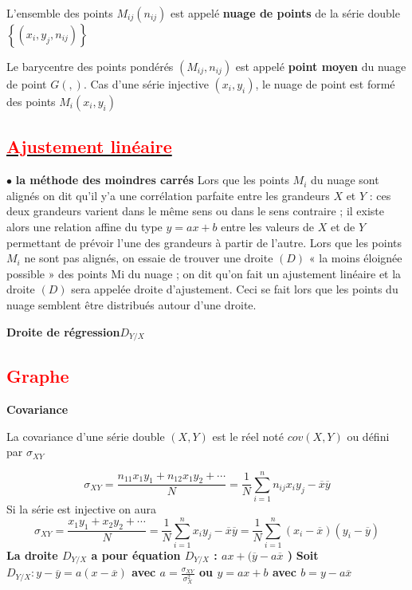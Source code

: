 \documentclass[12pt]{article}
\begin{document}
L’ensemble des points $M_{ij}(n_{ij})$ est appelé \textbf{nuage de points} de la série double   
$\left\lbrace (x_{i} , y_{j}, n_{ij}) \right\rbrace $

Le barycentre des points pondérés $( M_{ij}, n_{ij})$ est appelé \textbf{point moyen} du nuage de point $G( , )$.
Cas d’une série injective ${(x_{i} , y_{i})}$, le nuage de point est formé des points 
$M_{i} (x_{i} , y_{i})$
\subsection*{\underline{\textbf{\textcolor{red}{Ajustement linéaire}}}}
$\bullet$ \textbf{la méthode des moindres carrés} 
Lors que les points $M_{i}$ du nuage sont alignés on dit qu’il y’a une corrélation parfaite entre les grandeurs $X$ et $Y$ : ces deux grandeurs varient dans le même sens ou dans le sens contraire ; il existe alors une relation affine du type $y= ax + b$ entre les valeurs de $X$ et de $Y$ permettant de prévoir l’une des grandeurs à partir de l’autre.
Lors que les points $M_{i}$ ne sont pas alignés, on essaie de trouver une droite $(D)$ « la moins éloignée possible » des points Mi du nuage ; on dit qu’on fait un ajustement linéaire et la droite $(D)$ sera appelée droite d’ajustement.
Ceci se fait lors que les points du nuage semblent être distribués autour d’une droite.

\textbf{Droite de régression$D_{Y/X}$}

\subsection*{\textbf{\textcolor{red}{Graphe}}}

\textbf{Covariance}

La covariance d’une série double $(X,Y)$ est le réel noté $cov(X,Y)$ ou défini par $\sigma_{XY}$ 

\[\sigma_{XY}=\frac{n_{11}x_{1}y_{1}+n_{12}x_{1}y_{2}+\cdots}{N}=\frac{1}{N}\sum_{i=1}^{n}n_{ij}x_{i}y_{j}-\overline{x}\overline{y}\]
Si la série est injective on aura                                                           
\[\sigma_{XY}=\frac{x_{1}y_{1}+x_{2}y_{2}+\cdots}{N}=\frac{1}{N}\sum_{i=1}^{n}x_{i}y_{j}-\overline{x}\overline{y}=\frac{1}{N}\sum_{i=1}^{n}(x_{i}-\overline{x})(y_{i}-\overline{y})\]
\textbf{La droite $D_{Y/X}$  a pour équation $D_{Y/X}$ : $ax+( \overline{y}-a\overline{x}$ )}
\textbf{Soit $D_{Y/X} : y -\overline{y}= a(x -\overline{x})$ avec  $a = \frac{\sigma_{XY}}{\sigma_{X}^{2}}$ ou $y = ax + b$   avec $b = y-a\overline{x}$}
\end{document}
